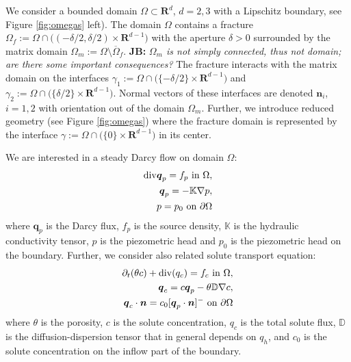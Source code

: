 \documentclass[a4paper]{article}
\def\prtl{\partial}
\def\vc#1{\mathbf{\boldsymbol{#1}}}     %
\def\tn#1{{\mathbb{#1}}}    %
\def\div{{\rm div}}
\def\grad{\nabla}
\def\Real{{\mathbf R}}
\newcommand{\note}[2]{{\color{blue} \textbf{ #1:} \textit{#2}}}
\begin{document}
We consider a bounded domain $\Omega \subset \Real^d$, $d=2,3$ with a Lipschitz boundary, see Figure \ref{fig:omegas} left). The domain $\Omega$ contains 
a fracture $\Omega_f:=\Omega\cap \big((-\delta/2,\delta/2)\times\Real^{d-1}\big)$ 
with the aperture $\delta>0$ surrounded by the matrix domain $\Omega_m:=\Omega\setminus\overline\Omega_f$. 
\note{JB}{$\Omega_m$ is not simply connected, thus not domain; are there some important consequences?}
The fracture interacts with the matrix domain on the interfaces 
$\gamma_1:=\Omega\cap\big( \{-\delta/2\}\times \Real^{d-1}\big)$ and 
$\gamma_2:=\Omega\cap\big( \{ \delta/2\}\times \Real^{d-1}\big)$. Normal vectors of these interfaces are denoted $\vc n_i$, $i=1,2$ with orientation out of the domain $\Omega_m$.
Further, we introduce reduced geometry (see Figure \ref{fig:omegas})
where the fracture domain is represented by the interface $\gamma:=\Omega\cap\big(\{0\}\times\Real^{d-1}\big)$ in its center. 

We are interested in a steady Darcy flow on domain $\Omega$:
\begin{subequations}
\label{eq:darcy_flow}
\begin{align}
    \div \vc q_p = f_p \mbox{ in }\Omega, \\
    \vc q_p = -\tn K \grad p, \\
    p=p_0\mbox{ on }\partial\Omega
\end{align}
\end{subequations}
where $\vc q_p$ is the Darcy flux, $f_p$ is the source density, $\tn K$ is the hydraulic conductivity tensor, $p$ is the piezometric head and $p_0$ is 
the piezometric head on the boundary.
Further, we consider also related solute transport equation:
\begin{subequations}
\label{eq:solute_transport}
\begin{align}
    \prtl_t (\theta c) + \div(q_c) = f_c \mbox{ in }\Omega,\\
    \vc q_c = c \vc q_p - \theta \tn D \grad c, \\
    \vc q_c \cdot \vc n= c_0 [\vc q_p \cdot \vc n]^-\mbox{ on }\partial\Omega
\end{align}
\end{subequations}
where $\theta$ is the porosity, $c$ is the solute concentration, $q_c$ is the total solute flux, 
$\tn D$ is the diffusion-dispersion tensor that in general depends on $q_h$, and 
$c_0$ is the solute concentration on the inflow part of the boundary.
\end{document}
